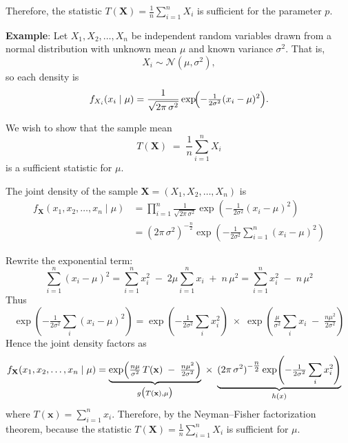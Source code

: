 \documentclass[twoside]{book}
\begin{document}
\begin{enumerate}
    Therefore, the statistic \(T(\textbf{X})=\frac{1}{n}\sum_{i=1}^n X_i\) is sufficient for the parameter \(p\).
    
    \bigskip
    
    \textbf{Example}: Let \(X_1, X_2, \dots, X_n\) be independent random variables drawn from a normal distribution with unknown mean \(\mu\) and known variance \(\sigma^2\).  That is,
    \[
    X_i \sim \mathcal{N}(\mu,\sigma^2),
    \]
    so each density is
    \[
    f_{X_i}(x_i \mid \mu)
    =
    \frac{1}{\sqrt{2\pi\,\sigma^2}}
    \exp\!\Bigl(-\tfrac{1}{2\sigma^2}(x_i - \mu)^2\Bigr).
    \]
    
    We wish to show that the sample mean
    \[
    T(\mathbf{X}) \;=\; \frac{1}{n}\sum_{i=1}^n X_i
    \]
    is a sufficient statistic for \(\mu\).
       
    The joint density of the sample \(\mathbf{X}=(X_1,X_2,\dots,X_n)\) is
    \[
    \begin{aligned}
    f_{\mathbf{X}}(x_1,x_2,\dots,x_n \mid \mu)
    &=
    \prod_{i=1}^{n}
    \frac{1}{\sqrt{2\pi\,\sigma^2}}
    \exp\!\left( -\tfrac{1}{2\sigma^2}(x_i - \mu)^2\right) \\
    &=
    (2\pi\,\sigma^2)^{-\tfrac{n}{2}}
    \exp\!\left( -\tfrac{1}{2\sigma^2}\sum_{i=1}^n (x_i - \mu)^2\right)
    \end{aligned}
    \]
    
    Rewrite the exponential term:
    \[
    \sum_{i=1}^n (x_i - \mu)^2
    =
    \sum_{i=1}^n x_i^2
    \;-\;2\mu\sum_{i=1}^n x_i
    \;+\;n\,\mu^2 = \sum_{i=1}^n x_i^2\;-\;n\,\mu^2
    \]
    Thus
    \[
    \exp\!\left( -\tfrac{1}{2\sigma^2}\sum_i (x_i - \mu)^2\right) 
    =
    \exp\!\left( -\tfrac{1}{2\sigma^2}\sum_i x_i^2\right) 
    \;\times\;
    \exp\!\left( \tfrac{\mu}{\sigma^2}\sum_i x_i \;-\;\tfrac{n\mu^2}{2\sigma^2}\right) 
    \]
    Hence the joint density factors as
    \[
    \begin{aligned}
    f_{\textbf{X}}(x_1,x_2,\dots,x_n \mid \mu)
    &=
    \underbrace{%
    \exp\!\left( \tfrac{n\mu}{\sigma^2}\,T(\textbf{x})
         \;-\;\tfrac{n\mu^2}{2\sigma^2}\right) 
    }_{g\bigl(T(\textbf{x}),\mu\bigr)}
    \;\times\;
    \underbrace{%
    (2\pi\,\sigma^2)^{-\tfrac{n}{2}}
    \exp\!\left( -\tfrac{1}{2\sigma^2}\sum_i x_i^2\right) 
    }_{h(x)}
    \end{aligned}
    \]
    where \(T(\textbf{x})=\sum_{i=1}^n x_i\). Therefore, by the Neyman–Fisher factorization theorem, because the statistic
    \(\displaystyle T(\mathbf{X})=\frac{1}{n}\sum_{i=1}^n X_i\) is sufficient for \(\mu\).
    

\end{enumerate}
\end{document}

